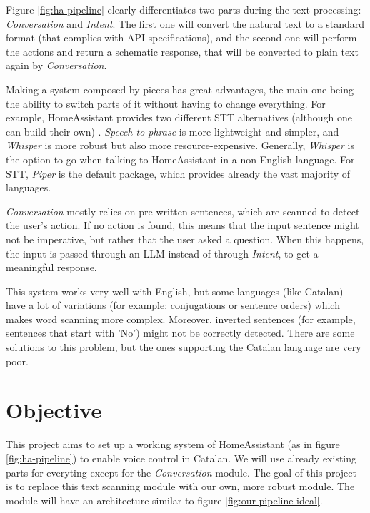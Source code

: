 \documentclass{article}
\begin{document}
Figure \ref{fig:ha-pipeline} clearly differentiates two parts during the text processing: \textit{Conversation} and \textit{Intent}. The first one will convert the natural text to a standard format (that complies with API specifications), and the second one will perform the actions and return a schematic response, that will be converted to plain text again by \textit{Conversation}.

Making a system composed by pieces has great advantages, the main one being the ability to switch parts of it without having to change everything. For example, HomeAssistant provides two different STT alternatives (although one can build their own) \cite{homeassistantspeechoptions}. \textit{Speech-to-phrase} is more lightweight and simpler, and \textit{Whisper} is more robust but also more resource-expensive. Generally, \textit{Whisper} is the option to go when talking to HomeAssistant in a non-English language.
For STT, \textit{Piper} is the default package, which provides already the vast majority of languages.

\textit{Conversation} mostly relies on pre-written sentences, which are scanned to detect the user's action. If no action is found, this means that the input sentence might not be imperative, but rather that the user asked a question. When this happens, the input is passed through an LLM instead of through \textit{Intent}, to get a meaningful response.

This system works very well with English, but some languages (like Catalan) have a lot of variations (for example: conjugations or sentence orders) which makes word scanning more complex. Moreover, inverted sentences (for example, sentences that start with 'No') might not be correctly detected. There are some solutions to this problem, but the ones supporting the Catalan language are very poor.

\section{Objective}

This project aims to set up a working system of HomeAssistant (as in figure \ref{fig:ha-pipeline}) to enable voice control in Catalan. We will use already existing parts for everyting except for the \textit{Conversation} module. The goal of this project is to replace this text scanning module with our own, more robust module. The module will have an architecture similar to figure \ref{fig:our-pipeline-ideal}.
\end{document}

